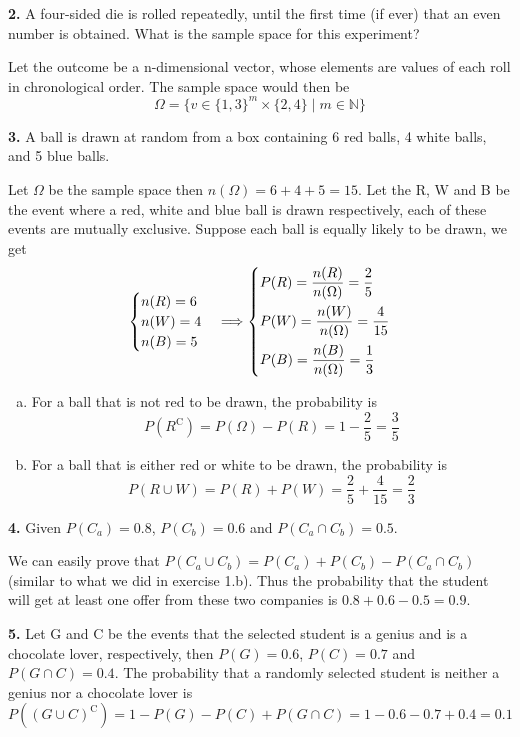 \documentclass[a4paper,12pt]{article}
\newcommand{\C}{\mathrm C}
\newcommand{\exercise}[1]{\noindent\textbf{#1.}}
\begin{document}
\exercise 2  A four-sided die is rolled repeatedly,
until the first time (if ever) that an even number is obtained.
What is the sample space for this experiment?

Let the outcome be a n-dimensional vector, whose elements are values
of each roll in chronological order.  The sample space would then be
\[\Omega = \{v \in \{1, 3\}^m\times\{2, 4\} \mid m \in \mathbb N\}\]

\exercise 3  A ball is drawn at random from a box containing 6 red balls,
4 white balls, and 5 blue balls.

Let $\Omega$ be the sample space then $n(\Omega) = 6 + 4 + 5 = 15$.
Let the R, W and B be the event where a red, white and blue ball is drawn
respectively, each of these events are mutually exclusive.  Suppose each ball
is equally likely to be drawn, we get
\[\begin{cases}
  n(R) = 6\\
  n(W) = 4\\
  n(B) = 5
\end{cases}
\Longrightarrow\begin{dcases}
  P(R) = \frac{n(R)}{n(\Omega)} = \frac{2}{5}\\
  P(W) = \frac{n(W)}{n(\Omega)} = \frac{4}{15}\\
  P(B) = \frac{n(B)}{n(\Omega)} = \frac{1}{3}
\end{dcases}\]

\begin{enumerate}[(a)]
  \item For a ball that is not red to be drawn, the probability is
    \[P\left(R^\C\right) = P(\Omega) - P(R) = 1 - \frac 2 5 = \frac 3 5\]
  \item For a ball that is either red or white to be drawn, the probability is
    \[P(R\cup W) = P(R) + P(W) = \frac{2}{5} + \frac{4}{15} = \frac 2 3\]
\end{enumerate}

\exercise 4  Given $P(C_a) = 0.8$, $P(C_b) = 0.6$ and $P(C_a\cap C_b) = 0.5$.

We can easily prove that $P(C_a\cup C_b) = P(C_a) + P(C_b) - P(C_a\cap C_b)$
(similar to what we did in exercise 1.b).  Thus the probability that the student
will get at least one offer from these two companies is $0.8 + 0.6 - 0.5 = 0.9$.

\exercise 5  Let G and C be the events that the selected student is a genius and
is a chocolate lover, respectively, then $P(G) = 0.6$, $P(C) = 0.7$ and
$P(G\cap C) = 0.4$.  The probability that a randomly selected student is
neither a genius nor a chocolate lover is
\[P\left((G\cup C)^\C\right) = 1 - P(G) - P(C) + P(G\cap C)
= 1 - 0.6 - 0.7 + 0.4 = 0.1\]
\end{document}
